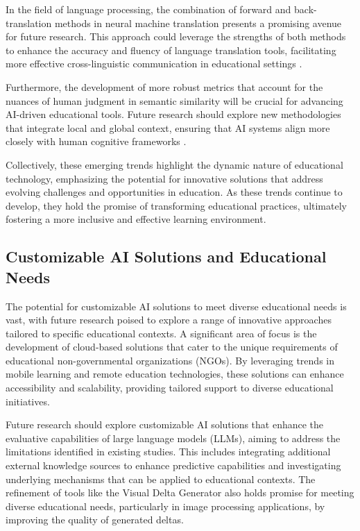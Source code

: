 In the field of language processing, the combination of forward and back-translation methods in neural machine translation presents a promising avenue for future research. This approach could leverage the strengths of both methods to enhance the accuracy and fluency of language translation tools, facilitating more effective cross-linguistic communication in educational settings \cite{bogoychev2020domaintranslationesenoisesynthetic}.

Furthermore, the development of more robust metrics that account for the nuances of human judgment in semantic similarity will be crucial for advancing AI-driven educational tools. Future research should explore new methodologies that integrate local and global context, ensuring that AI systems align more closely with human cognitive frameworks \cite{yamshchikov2020styletransferparaphraselookingsensible}.

Collectively, these emerging trends highlight the dynamic nature of educational technology, emphasizing the potential for innovative solutions that address evolving challenges and opportunities in education. As these trends continue to develop, they hold the promise of transforming educational practices, ultimately fostering a more inclusive and effective learning environment.


\subsection{Customizable AI Solutions and Educational Needs} \label{subsec:Customizable AI Solutions and Educational Needs}

The potential for customizable AI solutions to meet diverse educational needs is vast, with future research poised to explore a range of innovative approaches tailored to specific educational contexts. A significant area of focus is the development of cloud-based solutions that cater to the unique requirements of educational non-governmental organizations (NGOs). By leveraging trends in mobile learning and remote education technologies, these solutions can enhance accessibility and scalability, providing tailored support to diverse educational initiatives.



Future research should explore customizable AI solutions that enhance the evaluative capabilities of large language models (LLMs), aiming to address the limitations identified in existing studies. This includes integrating additional external knowledge sources to enhance predictive capabilities and investigating underlying mechanisms that can be applied to educational contexts. The refinement of tools like the Visual Delta Generator also holds promise for meeting diverse educational needs, particularly in image processing applications, by improving the quality of generated deltas.



